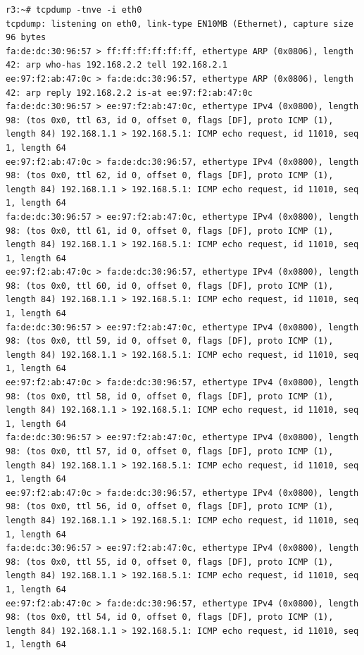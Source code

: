 \documentclass[a4paper,12pt]{article}
\begin{document}
\begin{Verbatim}
r3:~# tcpdump -tnve -i eth0
tcpdump: listening on eth0, link-type EN10MB (Ethernet), capture size 96 bytes
fa:de:dc:30:96:57 > ff:ff:ff:ff:ff:ff, ethertype ARP (0x0806), length 42: arp who-has 192.168.2.2 tell 192.168.2.1
ee:97:f2:ab:47:0c > fa:de:dc:30:96:57, ethertype ARP (0x0806), length 42: arp reply 192.168.2.2 is-at ee:97:f2:ab:47:0c
fa:de:dc:30:96:57 > ee:97:f2:ab:47:0c, ethertype IPv4 (0x0800), length 98: (tos 0x0, ttl 63, id 0, offset 0, flags [DF], proto ICMP (1), length 84) 192.168.1.1 > 192.168.5.1: ICMP echo request, id 11010, seq 1, length 64
ee:97:f2:ab:47:0c > fa:de:dc:30:96:57, ethertype IPv4 (0x0800), length 98: (tos 0x0, ttl 62, id 0, offset 0, flags [DF], proto ICMP (1), length 84) 192.168.1.1 > 192.168.5.1: ICMP echo request, id 11010, seq 1, length 64
fa:de:dc:30:96:57 > ee:97:f2:ab:47:0c, ethertype IPv4 (0x0800), length 98: (tos 0x0, ttl 61, id 0, offset 0, flags [DF], proto ICMP (1), length 84) 192.168.1.1 > 192.168.5.1: ICMP echo request, id 11010, seq 1, length 64
ee:97:f2:ab:47:0c > fa:de:dc:30:96:57, ethertype IPv4 (0x0800), length 98: (tos 0x0, ttl 60, id 0, offset 0, flags [DF], proto ICMP (1), length 84) 192.168.1.1 > 192.168.5.1: ICMP echo request, id 11010, seq 1, length 64
fa:de:dc:30:96:57 > ee:97:f2:ab:47:0c, ethertype IPv4 (0x0800), length 98: (tos 0x0, ttl 59, id 0, offset 0, flags [DF], proto ICMP (1), length 84) 192.168.1.1 > 192.168.5.1: ICMP echo request, id 11010, seq 1, length 64
ee:97:f2:ab:47:0c > fa:de:dc:30:96:57, ethertype IPv4 (0x0800), length 98: (tos 0x0, ttl 58, id 0, offset 0, flags [DF], proto ICMP (1), length 84) 192.168.1.1 > 192.168.5.1: ICMP echo request, id 11010, seq 1, length 64
fa:de:dc:30:96:57 > ee:97:f2:ab:47:0c, ethertype IPv4 (0x0800), length 98: (tos 0x0, ttl 57, id 0, offset 0, flags [DF], proto ICMP (1), length 84) 192.168.1.1 > 192.168.5.1: ICMP echo request, id 11010, seq 1, length 64
ee:97:f2:ab:47:0c > fa:de:dc:30:96:57, ethertype IPv4 (0x0800), length 98: (tos 0x0, ttl 56, id 0, offset 0, flags [DF], proto ICMP (1), length 84) 192.168.1.1 > 192.168.5.1: ICMP echo request, id 11010, seq 1, length 64
fa:de:dc:30:96:57 > ee:97:f2:ab:47:0c, ethertype IPv4 (0x0800), length 98: (tos 0x0, ttl 55, id 0, offset 0, flags [DF], proto ICMP (1), length 84) 192.168.1.1 > 192.168.5.1: ICMP echo request, id 11010, seq 1, length 64
ee:97:f2:ab:47:0c > fa:de:dc:30:96:57, ethertype IPv4 (0x0800), length 98: (tos 0x0, ttl 54, id 0, offset 0, flags [DF], proto ICMP (1), length 84) 192.168.1.1 > 192.168.5.1: ICMP echo request, id 11010, seq 1, length 64

\end{Verbatim}
\end{document}
